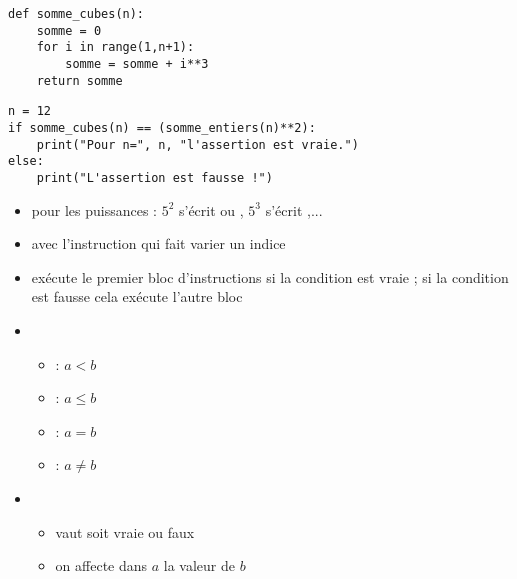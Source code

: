 \begin{frame}[fragile]
\begin{algo}
\begin{lstlisting}
def somme_cubes(n):
    somme = 0
    for i in range(1,n+1):
        somme = somme + i**3
    return somme 
\end{lstlisting}  
\end{algo}

\pause

\begin{algo}
\begin{lstlisting}
n = 12
if somme_cubes(n) == (somme_entiers(n)**2):
    print("Pour n=", n, "l'assertion est vraie.")
else:   
    print("L'assertion est fausse !")
\end{lstlisting}  
\end{algo}
\end{frame}




 
 
\begin{frame}

\begin{itemize} 

  \item \codeinline{**} pour les puissances : $5^2$ s'écrit  ou ,
    $5^3$ s'écrit ,...  
 
\pause   
  \item {}
avec l'instruction  qui fait varier un indice
\pause

  \item {} 
  exécute le premier 
  bloc d'instructions si la condition est vraie ; 
   si la condition est fausse cela exécute l'autre bloc

\pause
   
  \item
  \begin{itemize}
     \item {} : $a<b$
     \item {} : $a \le b$
     \item {} : $a=b$
     \item {} : $a \neq b$
  \end{itemize} 

\pause

  \item
  \begin{itemize}
     \item {} vaut soit vraie ou faux
\pause

     \item {} on affecte dans $a$ la valeur de $b$
  \end{itemize}
\end{itemize}
\end{frame}


